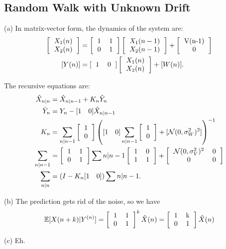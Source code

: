 \subsection{Random Walk with Unknown Drift}
(a) In matrix-vector form, the dynamics of the system are:
\begin{align*}
    \left[\begin{tabular}{c} $X_1(n)$ \\ $X_2(n)$ \end{tabular}\right] &= \left[\begin{tabular}{cc} 1 & 1 \\ 0 & 1 \end{tabular}\right]\left[\begin{tabular}{c} $X_1(n-1)$ \\ $X_2(n-1)$ \end{tabular}\right] + \left[\begin{tabular}{c} V(n-1) \\ 0 \end{tabular}\right] \\
    [Y(n)] &= [\begin{tabular}{cc} 1 & 0 \end{tabular}]\left[\begin{tabular}{c} $X_1(n)$ \\ $X_2(n)$ \end{tabular}\right] + [W(n)].
\end{align*}

The recursive equations are:
\begin{align*}
    \hat{X}_{n|n} &= \hat{X}_{n|n-1} + K_n\hat{Y}_n \\
    \Tilde{Y}_n &= Y_n - [1\quad 0]\hat{X}_{n|n-1} \\
    K_n &= \sum_{n|n-1}\left[\begin{tabular}{c} 1 \\ 0 \end{tabular}\right]\left([1\quad 0]\sum_{n|n-1}\left[\begin{tabular}{c} 1 \\ 0 \end{tabular}\right] + [\Nor(0, \sigma_W^2)^2]\right)^{-1} \\
    \sum_{n|n-1} &= \left[\begin{tabular}{cc} 1 & 1 \\ 0 & 1 \end{tabular}\right]\sum{n|n-1}\left[\begin{tabular}{cc} 1 & 0 \\ 1 & 1 \end{tabular}\right] + \left[\begin{tabular}{cc} $\Nor(0, \sigma_V^2)^2$ & 0 \\ 0 & 0 \end{tabular}\right] \\
    \sum_{n|n} &= (I - K_n[1\quad 0])\sum{n|n-1}.
\end{align*}

(b) The prediction gets rid of the noise, so we have
\[
\E[X(n + k) | Y^{(n)}] = \left[\begin{tabular}{cc} 1 & 1 \\ 0 & 1 \end{tabular}\right]^k\hat{X}(n) = \left[\begin{tabular}{cc} 1 & k \\ 0 & 1 \end{tabular}\right]\hat{X}(n)
\]

(c) Eh.

